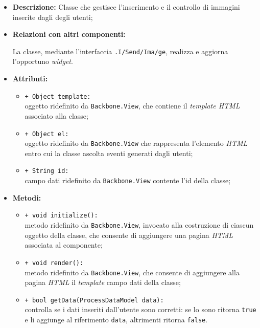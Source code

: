 \begin{flushleft}
\begin{itemize}
\item \textbf{Descrizione:} Classe che gestisce l'inserimento e il controllo di immagini inserite dagli degli utenti;
\item \textbf{Relazioni con altri componenti:}
\begin{sloppypar}
La classe, mediante l'interfaccia \texttt{\viewUser{}.I\fshyp{}Send\fshyp{}Ima\fshyp{}ge}, realizza e aggiorna l'opportuno \textit{widget}.
\end{sloppypar}
\item \textbf{Attributi:}
\begin{sloppypar}
\begin{itemize}
\item \texttt{+ Object template:}\\ oggetto ridefinito da \texttt{Backbone.View}, che contiene il \textit{template HTML} associato alla classe;
\item \texttt{+ Object el:}\\ oggetto ridefinito da \texttt{Backbone.View} che rappresenta l'elemento \textit{HTML} entro cui la classe ascolta eventi generati dagli utenti;
\item \texttt{+ String id:}\\ campo dati ridefinito da \texttt{Backbone.View} contente l'id della classe;
\end{itemize}
\end{sloppypar}
\item \textbf{Metodi:}
\begin{sloppypar}
\begin{itemize}
\item \texttt{+ void initialize():}\\ metodo ridefinito da \texttt{Backbone.View}, invocato alla costruzione di ciascun oggetto della classe, che consente di aggiungere una pagina \textit{HTML} associata al componente;
\item \texttt{+ void render():}\\ metodo ridefinito da \texttt{Backbone.View}, che consente di aggiungere alla pagina \textit{HTML} il \textit{template} campo dati della classe;
\item \texttt{+ bool getData(ProcessDataModel data):}\\ controlla se i dati inseriti dall'utente sono corretti: se lo sono ritorna \texttt{true} e li aggiunge al riferimento \texttt{data}, altrimenti ritorna \texttt{false}.
\end{itemize}
\end{sloppypar}
\end{itemize}
\end{flushleft}

